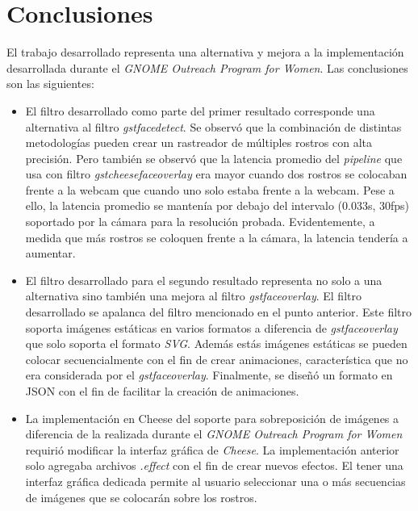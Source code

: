 \documentclass[a4paper,openright,12pt]{report}
\begin{document}
\section{Conclusiones}
  El trabajo desarrollado representa una alternativa y mejora a la
  implementación desarrollada durante el \textit{GNOME Outreach Program for
  Women}. Las conclusiones son las siguientes:\\

  \begin{itemize}
    \item
      El filtro desarrollado como parte del primer resultado corresponde
      una alternativa al filtro \textit{\gls{gstfacedetect}}. Se observó que la
      combinación de distintas metodologías pueden crear un rastreador de
      múltiples rostros con alta precisión. Pero también se observó que
      la latencia promedio del \textit{pipeline} que usa con filtro
      \textit{gstcheesefaceoverlay} era mayor cuando dos rostros se colocaban
      frente a la webcam que cuando uno solo estaba frente a la webcam. Pese a
      ello, la latencia promedio se mantenía por debajo del intervalo
      (0.033s, 30fps) soportado por la cámara para la resolución probada.
      Evidentemente, a medida que más rostros se coloquen frente a la cámara, la
      latencia tendería a aumentar.
    \item
      El filtro desarrollado para el segundo resultado representa no solo a una
      alternativa sino también una mejora al filtro \textit{gstfaceoverlay}. El
      filtro desarrollado se apalanca del filtro mencionado en el punto
      anterior. Este filtro soporta imágenes estáticas en varios formatos a
      diferencia de \textit{gstfaceoverlay} que solo soporta el formato
      \textit{SVG}. Además estás imágenes estáticas se pueden colocar
      secuencialmente con el fin de crear animaciones, característica
      que no era considerada por el \textit{gstfaceoverlay}. Finalmente,
      se diseñó un formato en JSON con el fin de facilitar la creación de
      animaciones.
  \end{itemize}
  \clearpage
  \begin{itemize}
    \item
      La implementación en Cheese del soporte para sobreposición de imágenes
      a diferencia de la realizada durante el \textit{GNOME Outreach Program
      for Women} requirió modificar la interfaz gráfica de \textit{Cheese}. La
      implementación anterior solo agregaba archivos \textit{.effect} con el fin
      de crear nuevos efectos. El tener una interfaz gráfica dedicada permite
      al usuario seleccionar una o más secuencias de imágenes que se colocarán
      sobre los rostros.
  \end{itemize}
\end{document}
